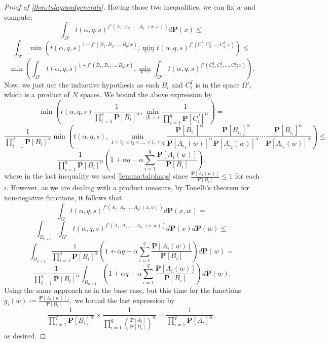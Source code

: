 \documentclass[11pt]{article}%
\numberwithin{theorem}{subsection}
\newcommand{\prob}{\mathbf{P}}
\begin{document}
\begin{proof}[Proof of \cref{thm:talagrandgenerals}]
\noindent
Having those two inequalities, we can fix $w$ and compute:
$$
\int_{\Omega'}
t(\alpha, q, s)^{f^s(A_1, A_2, \ldots, A_q; (x,w))}d\prob(x)\le 
$$
$$
\int_{\Omega'}
\min\left(
t(\alpha, q, s)^{1+f^s(B_1, B_2, \ldots, B_q; x)},
\min_{_{|I|  =s}}
t(\alpha, q, s)^{
f^s(C^I_1, C^I_2, \ldots, C^I_q; x)
}
\right)\le 
$$
$$
\min\left(
\int_{\Omega'}
t(\alpha, q, s)^{1+f^s(B_1, B_2, \ldots, B_q;x)},
\min_{_{|I|  =s}}
\int_{\Omega'}
t(\alpha, q, s)^{
f^s(C^I_1, C^I_2, \ldots, C^I_q; x)
}
\right).
$$
Now, we just use the inductive hypothesis as each $B_i$ and $C^I_i$ is in the space $\Omega',$ which is a product of $N$ spaces. We bound the above expression by
$$
\min\left(
t(\alpha, q,s)
\frac{1}{\prod_{i=1}^q \prob[B_i]^\alpha}, 
\min_{|I| = s}
\frac{1}{\prod_{i=1}^q \prob[C^I_i]^\alpha}
\right) = 
$$
$$
\frac{1}{\prod_{i=1}^q \prob[B_i]^\alpha}
\min\left(
t(\alpha, q,s), 
\min_{1\le i_1<i_2<\ldots <i_s\le q}
\frac{\prob[B_{i_1}]^\alpha}{\prob[A_{i_1}(w)]^\alpha}
\frac{\prob[B_{i_2}]^\alpha}{\prob[A_{i_2}(w)]^\alpha}
\cdots
\frac{\prob[B_{i_s}]^\alpha}{\prob[A_{i_s}(w)]^\alpha}
\right)\le
$$
$$
\frac{1}{\prod_{i=1}^q \prob[B_i]^\alpha}
\left(
1 + \alpha q - \alpha\sum_{i=1}^q\frac{\prob[A_i(w)]}{\prob[B_i]}\right),
$$
where in the last inequality we used \cref{lemma:talphaqs} since $\frac{\prob[A_i(w)]}{\prob[B_i]}\le 1$ for each $i.$ However, as we are dealing with a product measure, by Tonelli's theorem for non-negative functions, it follows that  
$$
\int_{\Omega}
t(\alpha, q, s)^{f^s(A_1, A_2, \ldots, A_q; (x,w))}d\prob(x,w)= 
$$
$$
\int_{\Omega_{n+1}}\int_{\Omega'}
t(\alpha, q, s)^{f^s(A_1, A_2, \ldots, A_q; (x,w))}d\prob(x)d\prob(w)\le 
$$
$$
\int_{\Omega_{n+1}}
\frac{1}{\prod_{i=1}^q \prob[B_i]^\alpha}
\left(
1 + \alpha q - \alpha\sum_{i=1}^q\frac{\prob[A_i(w)]}{\prob[B_i]}
\right)
d\prob(w) = 
$$
$$
\frac{1}{\prod_{i=1}^q \prob[B_i]^\alpha}
\int_{\Omega_{n+1}}
\left(
1 + \alpha q - \alpha\sum_{i=1}^q\frac{\prob[A_i(w)]}{\prob[B_i]}
\right)
d\prob(w).
$$
Using the same approach as in the base case, but this time for the functions $g_i(w):=\frac{\prob[A_i(w)])}{\prob[B_i]},$ we bound the last expression by 
$$
\frac{1}{\prod_{i=1}^q \prob[B_i]^\alpha}\times 
\frac{1}{\prod_{i=1}^q \left(\frac{\prob[A_i]}{\prob[B_i]}\right)^\alpha} = 
\frac{1}{\prod_{i=1}^q \prob[A_i]^\alpha},
$$
as desired.
\end{proof}
\end{document}
